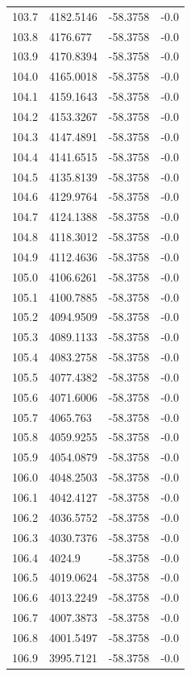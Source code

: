 \begin{table}[H]
\begin{tabular}{llll}
103.7 & 4182.5146 & -58.3758 & -0.0 \\
103.8 & 4176.677 & -58.3758 & -0.0 \\
103.9 & 4170.8394 & -58.3758 & -0.0 \\
104.0 & 4165.0018 & -58.3758 & -0.0 \\
104.1 & 4159.1643 & -58.3758 & -0.0 \\
104.2 & 4153.3267 & -58.3758 & -0.0 \\
104.3 & 4147.4891 & -58.3758 & -0.0 \\
104.4 & 4141.6515 & -58.3758 & -0.0 \\
104.5 & 4135.8139 & -58.3758 & -0.0 \\
104.6 & 4129.9764 & -58.3758 & -0.0 \\
104.7 & 4124.1388 & -58.3758 & -0.0 \\
104.8 & 4118.3012 & -58.3758 & -0.0 \\
104.9 & 4112.4636 & -58.3758 & -0.0 \\
105.0 & 4106.6261 & -58.3758 & -0.0 \\
105.1 & 4100.7885 & -58.3758 & -0.0 \\
105.2 & 4094.9509 & -58.3758 & -0.0 \\
105.3 & 4089.1133 & -58.3758 & -0.0 \\
105.4 & 4083.2758 & -58.3758 & -0.0 \\
105.5 & 4077.4382 & -58.3758 & -0.0 \\
105.6 & 4071.6006 & -58.3758 & -0.0 \\
105.7 & 4065.763 & -58.3758 & -0.0 \\
105.8 & 4059.9255 & -58.3758 & -0.0 \\
105.9 & 4054.0879 & -58.3758 & -0.0 \\
106.0 & 4048.2503 & -58.3758 & -0.0 \\
106.1 & 4042.4127 & -58.3758 & -0.0 \\
106.2 & 4036.5752 & -58.3758 & -0.0 \\
106.3 & 4030.7376 & -58.3758 & -0.0 \\
106.4 & 4024.9 & -58.3758 & -0.0 \\
106.5 & 4019.0624 & -58.3758 & -0.0 \\
106.6 & 4013.2249 & -58.3758 & -0.0 \\
106.7 & 4007.3873 & -58.3758 & -0.0 \\
106.8 & 4001.5497 & -58.3758 & -0.0 \\
106.9 & 3995.7121 & -58.3758 & -0.0 \\

\end{tabular}
\end{table}
